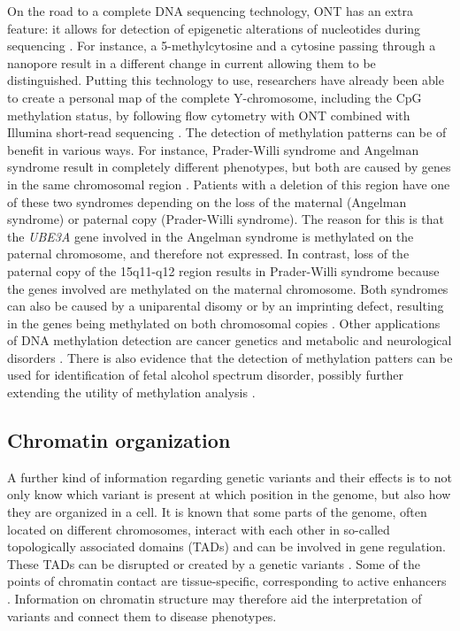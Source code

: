On the road to a complete DNA sequencing technology, ONT has an extra feature: it allows for detection of epigenetic alterations of nucleotides during sequencing \cite{Jain_2018a}. 
For instance, a 5-methylcytosine and a cytosine passing through a nanopore result in a different change in current allowing them to be distinguished. Putting this technology to use, researchers have already
been able to create a personal map of the complete Y-chromosome, including the CpG methylation status, by following flow cytometry with ONT combined with Illumina short-read sequencing \cite{Kuderna_2019}. 
The detection of methylation patterns can be of benefit in various ways. 
For instance, Prader-Willi syndrome and Angelman syndrome result in completely different phenotypes, but both are caused by genes in the same chromosomal region \cite{Adams_2008}. 
Patients with a deletion of this region have one of these two syndromes depending on the loss of the maternal (Angelman syndrome) or paternal copy (Prader-Willi syndrome). 
The reason for this is that the \textsl{UBE3A} gene involved in the Angelman syndrome is methylated on the paternal chromosome, and therefore not expressed. In contrast, loss of the paternal copy of the 15q11-q12 region results in Prader-Willi syndrome because the genes involved are methylated on the maternal chromosome.
Both syndromes can also be caused by a uniparental disomy or by an imprinting defect, resulting in the genes being methylated on both chromosomal copies \cite{Adams_2008}. 
Other applications of DNA methylation detection are cancer genetics and metabolic and neurological disorders \cite{Jin_2018}. 
There is also evidence that the detection of methylation patters can be used for identification of fetal alcohol spectrum disorder, possibly further extending the utility of methylation analysis \cite{Portales_Casamar_2016,Lussier_2018}. 

\subsection{Chromatin organization}
A further kind of information regarding genetic variants and their effects is to not only know which variant is present at which position in the genome, but also how they are organized in a cell. 
It is known that some parts of the genome, often located on different chromosomes, interact with each other in so-called topologically associated domains (TADs) and can be involved in gene regulation.
These TADs can be disrupted or created by a genetic variants \cite{Franke_2016,Krumm_2018}. 
Some of the points of chromatin contact are tissue-specific, corresponding to active enhancers \cite{Krumm_2018}. Information on chromatin structure may therefore aid the interpretation
of variants and connect them to disease phenotypes.

